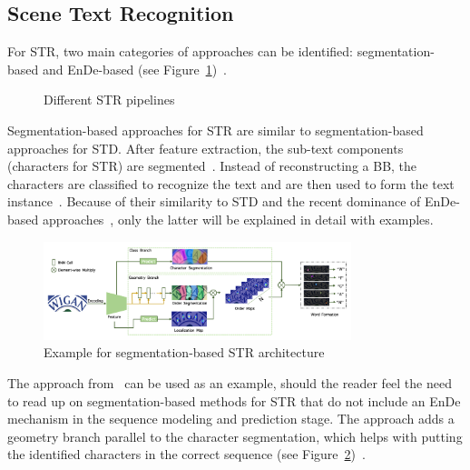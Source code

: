 \subsection{Scene Text Recognition}
For \ac{STR}, two main categories of approaches can be identified: segmentation-based and
\ac{EnDe}-based (see Figure~\ref{fig:str-pipelines})~\citep{chen_text_2021}.
\begin{figure}[h]
    \centering
    
    \caption{Different STR pipelines\label{fig:str-pipelines}}
\end{figure}
Segmentation-based approaches for \ac{STR} are similar to segmentation-based approaches for \ac{STD}.
After feature extraction, the sub-text components (characters for \ac{STR}) are
segmented~\citep{chen_text_2021}.
Instead of reconstructing a \ac{BB}, the characters are classified to recognize the
text and are then used to form the text instance~\citep{chen_text_2021}.
Because of their similarity to \ac{STD} and the recent dominance of \ac{EnDe}-based
approaches~\citep{chen_text_2021,long_scene_2021}, only the latter will be explained in detail with
examples.
\begin{figure}[ht]
    \centering
    \includegraphics[width=0.8\textwidth]{img/STR-seg-based-wan-textscaner-2020.png}
    \caption[Segmentation-based STR architecture]{%
        Example for segmentation-based STR
        architecture~\citep{wan_textscanner_2020}\label{fig:STR-segbased-architecture}
    }
\end{figure}
The approach from~\cite{wan_textscanner_2020} can be used as an example, should the reader feel the
need to read up on segmentation-based methods for \ac{STR} that do not include an \ac{EnDe}
mechanism in the sequence modeling and prediction stage.
The approach adds a geometry branch parallel to the character segmentation, which helps with
putting the identified characters in the correct sequence (see
Figure~\ref{fig:STR-segbased-architecture})~\citep{wan_textscanner_2020}.

